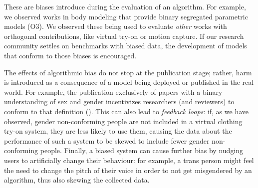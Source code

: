\documentclass[nonacm,sigconf,review,balance=false]{acmart}
\begin{document}

 These are biases introduce during the evaluation of an algorithm. For example, we observed works in body modeling that provide binary segregated parametric models (O3). We observed these being used to evaluate \emph{other} works with orthogonal contributions, like virtual try-on or motion capture. If our research community settles on benchmarks with biased data, the development of models that conform to those biases is encouraged.






 The effects of algorithmic bias do not stop at the publication stage; rather, harm is introduced as a consequence of a model being deployed or published in the real world. For example, the publication exclusively of papers with a binary understanding of sex and gender incentivizes researchers (and reviewers) to conform to that definition (\binary).
This can also lead to \emph{feedback loops}: if, as we have observed, gender non-conforming people are not included in a virtual clothing try-on system, they are less likely to use them, causing the data about the performance of such a system to be skewed to include fewer gender non-conforming people. Finally, a biased system can cause further bias by nudging users to artificially change their behaviour: for example, a trans person might feel the need to change the pitch of their voice in order to not get misgendered by an algorithm, thus also skewing the collected data.
\end{document}
